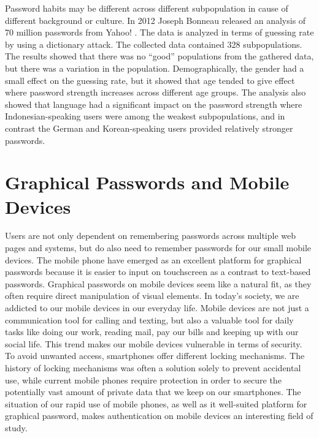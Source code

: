   Password habits may be different across different subpopulation in cause of different background or culture. In 2012 Joseph Bonneau released an analysis of 70 million passwords from Yahoo! \cite{Bonneau2}. The data is analyzed in terms of guessing rate by using a dictionary attack. The collected data contained 328 subpopulations. The results showed that there was no ``good'' populations from the gathered data, but there was a variation in the population. Demographically, the gender had a small effect on the guessing rate, but it showed that age tended to give effect where password strength increases across different age groups. The analysis also showed that language had a significant impact on the password strength where Indonesian-speaking users were among the weakest subpopulations, and in contrast the German and Korean-speaking users provided relatively stronger passwords.

  

  \section{Graphical Passwords and Mobile Devices} \label{sec:mobiledevice}
  Users are not only dependent on remembering passwords across multiple web pages and systems, but do also need to remember passwords for our small mobile devices. The mobile phone have emerged as an excellent platform for graphical passwords because it is easier to input on touchscreen as a contrast to text-based passwords. Graphical passwords on mobile devices seem like a natural fit, as they often require direct manipulation of visual elements. In today's society, we are addicted to our mobile devices in our everyday life. Mobile devices are not just a communication tool for calling and texting, but also a valuable tool for daily tasks like doing our work, reading mail, pay our bills and keeping up with our social life. This trend makes our mobile devices vulnerable in terms of security. To avoid unwanted access, smartphones offer different locking mechanisms. The history of locking mechanisms was often a solution solely to prevent accidental use, while current mobile phones require protection in order to secure the potentially vast amount of private data that we keep on our smartphones. The situation of our rapid use of mobile phones, as well as it well-suited platform for graphical password, makes authentication on mobile devices an interesting field of study.

